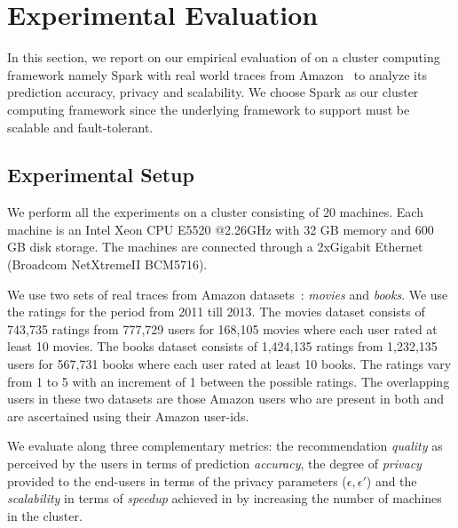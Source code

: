 \section{Experimental Evaluation}
\label{Evaluation}
In this section, we report on our empirical evaluation of \crossrec on a cluster computing framework namely Spark with real world traces from Amazon~\cite{mcauley2013hidden} to analyze its prediction accuracy, privacy and scalability. We choose Spark as our cluster computing framework since the underlying framework to support \crossrec must be scalable and fault-tolerant.


\subsection{Experimental Setup}

We perform all the experiments on a cluster consisting of 20 machines. Each machine is an Intel Xeon CPU E5520 @2.26GHz with 32 GB memory and 600 GB disk storage. The machines are connected through a 2xGigabit Ethernet (Broadcom NetXtremeII BCM5716).

We use two sets of real traces from Amazon datasets~\cite{mcauley2013hidden}: \emph{movies} and \emph{books}. We use the ratings for the period from 2011 till 2013. The movies dataset consists of 743,735 ratings from 777,729 users for 168,105 movies where each user rated at least 10 movies. The books dataset consists of 1,424,135 ratings from 1,232,135 users for 567,731 books where each user rated at least 10 books. The ratings vary from 1 to 5 with an increment of 1 between the possible ratings. The overlapping users in these two datasets are those Amazon users who are present in both and are ascertained using their Amazon user-ids.

We evaluate \crossrec along three complementary metrics: the recommendation \emph{quality} as perceived by the users in terms of prediction \emph{accuracy}, the degree of \emph{privacy} provided to the end-users in terms of the privacy parameters ($\epsilon, \epsilon'$) and the \emph{scalability} in terms of \emph{speedup} achieved in \crossrec by increasing the number of machines in the cluster.


